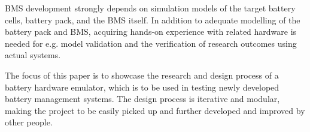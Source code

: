 BMS development strongly depends on simulation models of the target
battery cells, battery pack, and the BMS itself. In addition to adequate modelling 
of the battery pack and BMS, acquiring hands-on experience with related
hardware is needed for e.g. model validation and the verification of 
research outcomes using actual systems.

The focus of this paper is to showcase the research and design process of 
a battery hardware emulator, which is to be used in testing newly developed 
battery management systems. The design process is iterative and modular, 
making the project to be easily picked up and further developed and improved 
by other people.  